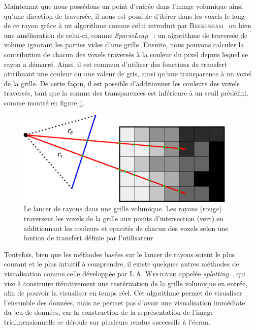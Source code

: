 {{{            Maintenant que nous possédons un point d'entrée dans l'image volumique ainsi qu'une direction de traversée, il nous est possible d'itérer dans les voxels le long de ce rayon grâce à un algorithme comme celui introduit par \textsc{Bresenham}~\cite{cite_bresenham} ou bien une amélioration de celui-ci, comme \textit{SparseLeap}~\cite{cite_sparseleap_space_skipping_traversal} : un algorithme de traversée de volume ignorant les parties vides d'une grille. Ensuite, nous pouvons calculer la contribution de chacun des voxels traversés à la couleur du pixel depuis lequel ce rayon a démarré. Ainsi, il est commun d'utiliser des fonctions de transfert attribuant une couleur ou une valeur de gris, ainsi qu'une transparence à un voxel de la grille. De cette façon, il est possible d'additionner les couleurs des voxels traversés, tant que la somme des transparences est inférieure à un seuil prédéfini, comme montré en figure \ref{img:raytracing_contribution}.

            \begin{figure}[h]
                \centering
                \includegraphics[width=.8\linewidth]{img/raytracing_contribution.png}
                \captionsetup{width=.8\linewidth}
                \caption{Le lancer de rayons dans une grille volumique. Les rayons (rouge) traversent les voxels de la grille aux points d'intersection (vert) en additionnant les couleurs et opacités de chacun des voxels selon une fontion de transfert définie par l'utilisateur.}
                \label{img:raytracing_contribution}
            \end{figure}

            Toutefois, bien que les méthodes basées sur le lancer de rayons soient le plus courant et le plus intuitif à comprendre, il existe quelques autres méthodes de visualisation comme celle développée par L.A. \textsc{Westover} appelée \textit{splatting}~\cite{cite_splatting}, qui vise à construire itérativement une rastérization de la grille volumique en entrée, afin de pouvoir la visualiser en temps réel. Cet algorithme permet de visualiser l'ensemble des données, mais ne permet pas d'avoir une visualisation immédiate du jeu de données, car la construction de la représentation de l'image tridimensionnelle se déroule sur plusieurs rendus successifs à l'écran.

}}}

